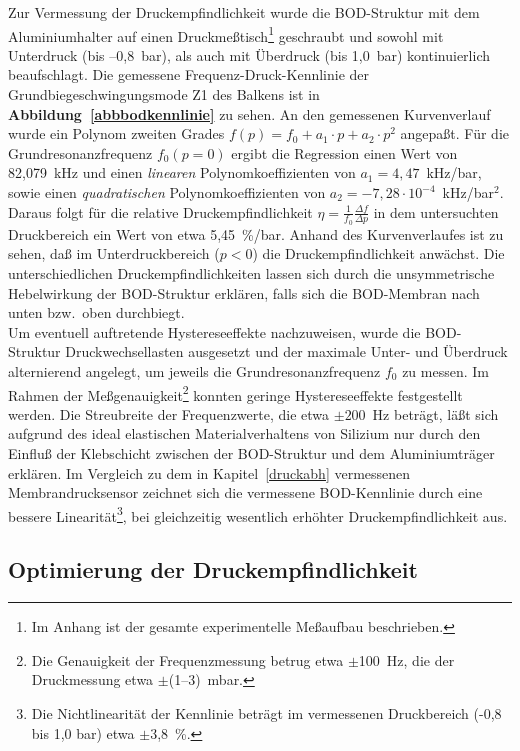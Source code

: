 Zur Vermessung der Druckempfindlichkeit wurde die BOD-Struktur mit dem
Aluminiumhalter auf einen Druckmeßtisch\footnote{Im Anhang ist der gesamte
experimentelle Meßaufbau beschrieben.} geschraubt
und sowohl mit Unterdruck (bis --0,8~bar), als auch mit Überdruck
(bis 1,0~bar) kontinuierlich beaufschlagt. Die gemessene
Frequenz-Druck-Kennlinie der Grundbiegeschwingungsmode Z1 des Balkens
ist in {\bf Abbildung~\ref{abbbodkennlinie}} zu sehen.
An den gemessenen Kurvenverlauf wurde ein Polynom zweiten Grades
$f(p) = f_{0} + a_{1} \cdot p + a_{2} \cdot p^{2}$
angepaßt. Für die Grundresonanzfrequenz $f_{0}(p=0)$ ergibt die Regression
einen Wert von 82,079~kHz und einen {\em linearen} Polynomkoeffizienten
von $a_{1} = 4,47$~kHz/bar, sowie einen {\em quadratischen} Polynomkoeffizienten
von $a_{2} = -7,28 \cdot 10^{-4}$~kHz/bar$^{2}$.
Daraus folgt für die relative Druckempfindlichkeit
$\eta = \frac{1}{f_{0}} \frac{\Delta f}{\Delta p}$ in dem untersuchten
Druckbereich ein Wert von etwa 5,45~\%/bar.
Anhand des Kurvenverlaufes ist zu sehen,
daß im Unterdruckbereich ($p < 0$) die Druckempfindlichkeit anwächst.
Die unterschiedlichen Druckempfindlichkeiten lassen sich durch
die unsymmetrische Hebelwirkung der BOD-Struktur erklären, falls sich die
BOD-Membran nach unten bzw.\ oben durchbiegt.\\
%
Um eventuell auftretende Hystereseeffekte nachzuweisen, wurde die
BOD-Struktur Druckwechsellasten ausgesetzt und der maximale Unter- und
Überdruck alternierend angelegt, um jeweils die Grundresonanzfrequenz
$f_{0}$ zu messen. Im Rahmen der Meßgenauigkeit\footnote{Die Genauigkeit
der Frequenzmessung betrug etwa $\pm$100~Hz, die der Druckmessung etwa
$\pm$(1--3)~mbar.} konnten geringe Hystereseeffekte festgestellt werden.
Die Streubreite der Frequenzwerte, die etwa $\pm 200$~Hz beträgt, läßt sich
aufgrund des ideal elastischen Materialverhaltens von Silizium \cite{Ove77}
nur durch den Einfluß der Klebschicht zwischen der BOD-Struktur und
dem Aluminiumträger erklären.
Im Vergleich zu dem in Kapitel~\ref{druckabh} vermessenen Membrandrucksensor
zeichnet sich die vermessene BOD-Kennlinie durch eine bessere
Linearität\footnote{Die Nichtlinearität der Kennlinie beträgt im
vermessenen Druckbereich (-0,8 bis 1,0 bar) etwa $\pm$3,8~\%.}, bei
gleichzeitig wesentlich erhöhter Druckempfindlichkeit aus.




\subsection{Optimierung der Druckempfindlichkeit}
\label{bodoptimierung}


